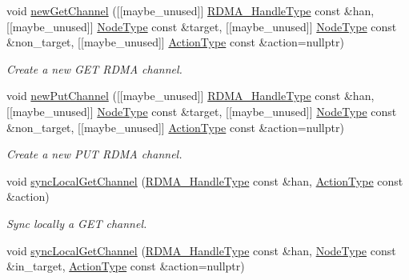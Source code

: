 \begin{DoxyCompactItemize}
void \hyperlink{structvt_1_1rdma_1_1_r_d_m_a_manager_a8eee749e5fe32977a1666b176acec4b7}{new\+Get\+Channel} (\mbox{[}\mbox{[}maybe\+\_\+unused\mbox{]}\mbox{]} \hyperlink{namespacevt_a10442579ec4e7ebef223818e64bcf908}{R\+D\+M\+A\+\_\+\+Handle\+Type} const \&han, \mbox{[}\mbox{[}maybe\+\_\+unused\mbox{]}\mbox{]} \hyperlink{namespacevt_a866da9d0efc19c0a1ce79e9e492f47e2}{Node\+Type} const \&target, \mbox{[}\mbox{[}maybe\+\_\+unused\mbox{]}\mbox{]} \hyperlink{namespacevt_a866da9d0efc19c0a1ce79e9e492f47e2}{Node\+Type} const \&non\+\_\+target, \mbox{[}\mbox{[}maybe\+\_\+unused\mbox{]}\mbox{]} \hyperlink{namespacevt_ae0a5a7b18cc99d7b732cb4d44f46b0f3}{Action\+Type} const \&action=nullptr)
\begin{DoxyCompactList}\small\item\em Create a new G\+ET R\+D\+MA channel. \end{DoxyCompactList}\item 
void \hyperlink{structvt_1_1rdma_1_1_r_d_m_a_manager_a393ba342c05cac5c5fe98d61d00de6c8}{new\+Put\+Channel} (\mbox{[}\mbox{[}maybe\+\_\+unused\mbox{]}\mbox{]} \hyperlink{namespacevt_a10442579ec4e7ebef223818e64bcf908}{R\+D\+M\+A\+\_\+\+Handle\+Type} const \&han, \mbox{[}\mbox{[}maybe\+\_\+unused\mbox{]}\mbox{]} \hyperlink{namespacevt_a866da9d0efc19c0a1ce79e9e492f47e2}{Node\+Type} const \&target, \mbox{[}\mbox{[}maybe\+\_\+unused\mbox{]}\mbox{]} \hyperlink{namespacevt_a866da9d0efc19c0a1ce79e9e492f47e2}{Node\+Type} const \&non\+\_\+target, \mbox{[}\mbox{[}maybe\+\_\+unused\mbox{]}\mbox{]} \hyperlink{namespacevt_ae0a5a7b18cc99d7b732cb4d44f46b0f3}{Action\+Type} const \&action=nullptr)
\begin{DoxyCompactList}\small\item\em Create a new P\+UT R\+D\+MA channel. \end{DoxyCompactList}\item 
void \hyperlink{structvt_1_1rdma_1_1_r_d_m_a_manager_a85e3bd458484375b762492ed0d65d9f5}{sync\+Local\+Get\+Channel} (\hyperlink{namespacevt_a10442579ec4e7ebef223818e64bcf908}{R\+D\+M\+A\+\_\+\+Handle\+Type} const \&han, \hyperlink{namespacevt_ae0a5a7b18cc99d7b732cb4d44f46b0f3}{Action\+Type} const \&action)
\begin{DoxyCompactList}\small\item\em Sync locally a G\+ET channel. \end{DoxyCompactList}\item 
void \hyperlink{structvt_1_1rdma_1_1_r_d_m_a_manager_aa38b010741db4c375e22662870549dd9}{sync\+Local\+Get\+Channel} (\hyperlink{namespacevt_a10442579ec4e7ebef223818e64bcf908}{R\+D\+M\+A\+\_\+\+Handle\+Type} const \&han, \hyperlink{namespacevt_a866da9d0efc19c0a1ce79e9e492f47e2}{Node\+Type} const \&in\+\_\+target, \hyperlink{namespacevt_ae0a5a7b18cc99d7b732cb4d44f46b0f3}{Action\+Type} const \&action=nullptr)

\end{DoxyCompactItemize}
